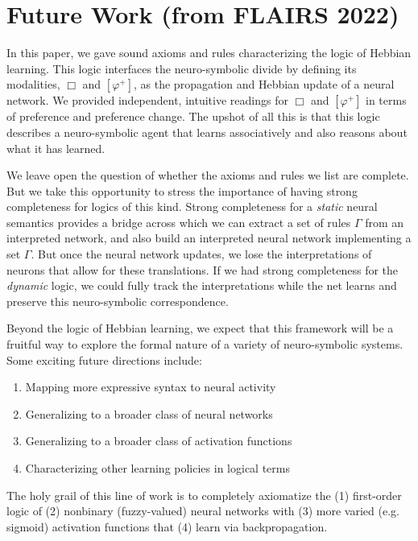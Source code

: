 \documentclass[12pt]{article}
\theoremstyle{definition}
\begin{document}


\section{\textcolor{myblue}{Future Work (from FLAIRS 2022)}}

In this paper, we gave sound axioms and rules characterizing the logic of Hebbian learning.  This logic interfaces the neuro-symbolic divide by defining its modalities, $\Box$ and $[\varphi^+]$, as the propagation and Hebbian update of a neural network.  We provided independent, intuitive readings for $\Box$ and $[\varphi^+]$ in terms of preference and preference change.  The upshot of all this is that this logic describes a neuro-symbolic agent that learns associatively and also reasons about what it has learned.

We leave open the question of whether the axioms and rules we list are complete.  But we take this opportunity to stress the importance of having strong completeness for logics of this kind.  Strong completeness for a \emph{static} neural semantics provides a bridge across which we can extract a set of rules $\Gamma$ from an interpreted network, and also build an interpreted neural network implementing a set $\Gamma$.  But once the neural network updates, we lose the interpretations of neurons that allow for these translations.  If we had strong completeness for the \emph{dynamic} logic, we could fully track the interpretations while the net learns and preserve this neuro-symbolic correspondence.

Beyond the logic of Hebbian learning, we expect that this framework will be a fruitful way to explore the formal nature of a variety of neuro-symbolic systems.  Some exciting future directions include:
\begin{enumerate}[itemsep=-1pt]
    \item Mapping more expressive syntax to neural activity
    \item Generalizing to a broader class of neural networks
    \item Generalizing to a broader class of activation functions
    \item Characterizing other learning policies in logical terms
\end{enumerate}
The holy grail of this line of work is to completely axiomatize the (1) first-order logic of (2) nonbinary (fuzzy-valued) neural networks with (3) more varied (e.g. sigmoid) activation functions that (4) learn via backpropagation.
\end{document}
